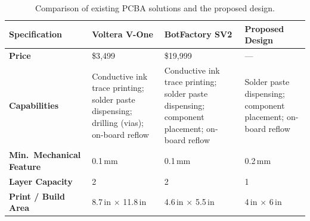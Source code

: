 

\begin{table}[H]
\centering
\caption{Comparison of existing PCBA solutions and the proposed design.}
\label{tab:comparison}
\renewcommand{\arraystretch}{1.3}
\small
\begin{tabularx}{\textwidth}{|>{\bfseries}l|Y|Y|Y|}
\hline
{}
Specification & \textbf{Voltera V-One} & \textbf{BotFactory SV2} & \textbf{Proposed Design} \\ \hline
Price                    & \$3{,}499 & \$19{,}999 & --- \\ \hline
Capabilities             & Conductive ink trace printing; solder paste dispensing; drilling (vias); on-board reflow
                         & Conductive ink trace printing; solder paste dispensing; component placement; on-board reflow
                         & Solder paste dispensing; component placement; on-board reflow \\ \hline
Min.\ Mechanical Feature & 0.1\,mm & 0.1\,mm & 0.2\,mm \\ \hline
Layer Capacity           & 2 & 2 & 1 \\ \hline
Print / Build Area       & 8.7\,in $\times$ 11.8\,in & 4.6\,in $\times$ 5.5\,in & 4\,in $\times$ 6\,in \\ \hline
\end{tabularx}
\end{table}
